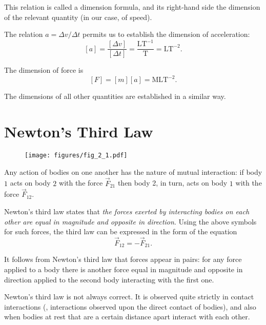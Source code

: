 \noindent
This relation is called a dimension formula, and its right-hand side the dimension of the relevant quantity (in our case, of speed).

The relation $a = \Delta v/\Delta t$ permits us to establish the dimension of acceleration:
\begin{equation}\label{eq:2_15}
[a] = \frac{[\Delta v]}{[\Delta t]} = \frac{\text{LT}^{-1}}{\text{T}} = \text{LT}^{-2}.
\end{equation}

\noindent
The dimension of force is
\begin{equation}\label{eq:2_16}
[F] = [m][a] = \text{MLT}^{-2}.
\end{equation}

\noindent
The dimensions of all other quantities are established in a similar way.

\section{Newton's Third Law}\label{sec:2_6}

\begin{figure}[t]
	\begin{center}
		\texttt{[image: figures/fig\_2\_1.pdf]}
		\caption[]{}
		\label{fig:2_1}
	\end{center}
	\vspace{-0.7cm}
\end{figure}

Any action of bodies on one another has the nature of mutual interaction: if body $1$ acts on body $2$ with the force $\vec{F}_{21}$ then body 2, in turn, acts on body $1$ with the force $\vec{F}_{12}$.

Newton's third law states that \textit{the forces exerted by interacting bodies on each other are equal in magnitude and opposite in direction}. Using the above symbols for such forces, the third law can be expressed in the form of the equation
\begin{equation}\label{eq:2_17}
\vec{F}_{12} = - \vec{F}_{21}.
\end{equation}

It follows from Newton's third law that forces appear in pairs: for any force applied to a body there is another force equal in magnitude and opposite in direction applied to the second body interacting with the first one.

Newton's third law is not always correct. It is observed quite strictly in contact interactions (\ie, interactions observed upon the direct contact of bodies), and also when bodies at rest that are a certain distance apart interact with each other.


